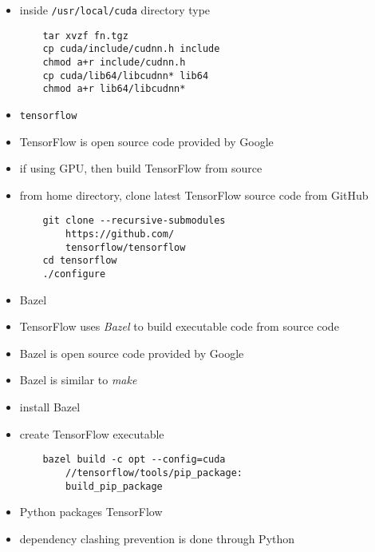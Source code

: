 \documentclass[twocolumn]{IEEEtran} %
\begin{document}
\begin{itemize}
        \item inside \verb|/usr/local/cuda| directory type
\begin{verbatim}
    tar xvzf fn.tgz
    cp cuda/include/cudnn.h include
    chmod a+r include/cudnn.h
    cp cuda/lib64/libcudnn* lib64
    chmod a+r lib64/libcudnn*
\end{verbatim}
    \ei
    \item \verb|tensorflow|
    \bi
        \item TensorFlow is open source code provided by Google
        \item if using GPU, then build TensorFlow from source
        \item from home directory, clone latest TensorFlow source code from GitHub
\begin{verbatim}
    git clone --recursive-submodules
        https://github.com/
        tensorflow/tensorflow
    cd tensorflow
    ./configure
\end{verbatim}
        \item Bazel
        \bi
            \item TensorFlow uses \emph{Bazel} to build executable code from source code
            \item Bazel is open source code provided by Google
            \bi
                \item Bazel is similar to \emph{make}
            \ei
            \item install Bazel
            \item  create TensorFlow executable
        \ei
\begin{verbatim}
    bazel build -c opt --config=cuda
        //tensorflow/tools/pip_package:
        build_pip_package
\end{verbatim}
    \item Python packages TensorFlow
        \bi
            \item dependency clashing prevention is done through Python
        \ei
    \ei

\end{itemize}
\end{document}
